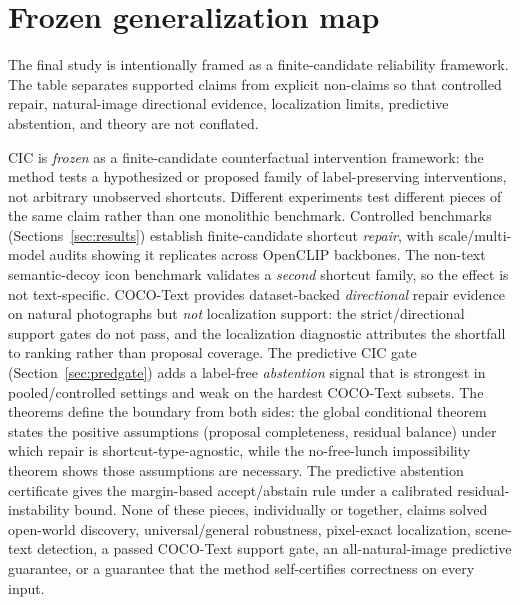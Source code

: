 \documentclass[11pt]{article}
\begin{document}
\section{Frozen generalization map}\label{sec:frozenmap}
The final study is intentionally framed as a finite-candidate reliability framework.
The table separates supported claims from explicit non-claims so that controlled
repair, natural-image directional evidence, localization limits, predictive
abstention, and theory are not conflated.

CIC is \emph{frozen} as a finite-candidate counterfactual intervention framework:
the method tests a hypothesized or proposed family of label-preserving interventions,
not arbitrary unobserved shortcuts. Different experiments test different pieces of the
same claim rather than one monolithic benchmark. Controlled benchmarks
(Sections~\ref{sec:results}) establish finite-candidate shortcut \emph{repair}, with
scale/multi-model audits showing it replicates across OpenCLIP backbones. The
non-text semantic-decoy icon benchmark validates a \emph{second} shortcut family,
so the effect is not text-specific. COCO-Text provides dataset-backed
\emph{directional} repair evidence on natural photographs but \emph{not} localization
support: the strict/directional support gates do not pass, and the localization
diagnostic attributes the shortfall to ranking rather than proposal coverage. The
predictive CIC gate (Section~\ref{sec:predgate}) adds a label-free
\emph{abstention} signal that is strongest in pooled/controlled settings and weak on
the hardest COCO-Text subsets. The theorems define the boundary from both sides: the
global conditional theorem states the positive assumptions (proposal completeness,
residual balance) under which repair is shortcut-type-agnostic, while the
no-free-lunch impossibility theorem shows those assumptions are necessary. The
predictive abstention certificate gives the margin-based accept/abstain rule under a
calibrated residual-instability bound. None of these pieces, individually or together,
claims solved open-world discovery, universal/general robustness, pixel-exact
localization, scene-text detection, a passed COCO-Text support gate, an
all-natural-image predictive guarantee, or a guarantee that the method self-certifies
correctness on every input.
\end{document}
